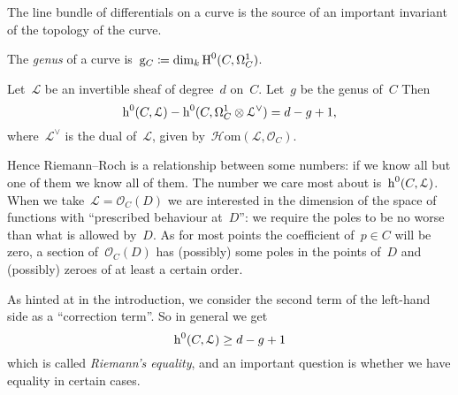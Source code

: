 \documentclass[10pt,a4paper]{article}
\begin{document}
The line bundle of differentials on a curve is the source of an important invariant of the topology of the curve.
\begin{definition}
  The \emph{genus} of a curve is~$\mathrm{g}_C\coloneqq\dim_k\operatorname{H}^0(C,\Omega_C^1)$.
\end{definition}
\begin{theorem}
  \label{theorem:riemann-roch}
  Let~$\mathcal{L}$ be an invertible sheaf of degree~$d$ on~$C$. Let~$g$ be the genus of~$C$ Then
  \begin{equation}
    \operatorname{h}^0(C,\mathcal{L})-\operatorname{h}^0(C,\Omega_C^1\otimes\mathcal{L}^\vee)=d-g+1,
  \end{equation}
  where~$\mathcal{L}^\vee$ is the dual of~$\mathcal{L}$, given by~$\mathcal{H}\mathrm{om}(\mathcal{L},\mathcal{O}_C)$.
\end{theorem}
Hence Riemann--Roch is a relationship between some numbers: if we know all but one of them we know all of them. The number we care most about is~$\operatorname{h}^0(C,\mathcal{L})$. When we take~$\mathcal{L}=\mathcal{O}_C(D)$ we are interested in the dimension of the space of functions with ``prescribed behaviour at~$D$'': we require the poles to be no worse than what is allowed by~$D$. As for most points the coefficient of~$p\in C$ will be zero, a section of~$\mathcal{O}_C(D)$ has (possibly) some poles in the points of~$D$ and (possibly) zeroes of at least a certain order.

As hinted at in the introduction, we consider the second term of the left-hand side as a ``correction term''. So in general we get
\begin{equation}
  \operatorname{h}^0(C,\mathcal{L})\geq d-g+1
\end{equation}
which is called \emph{Riemann's equality}, and an important question is whether we have equality in certain cases.
\end{document}
